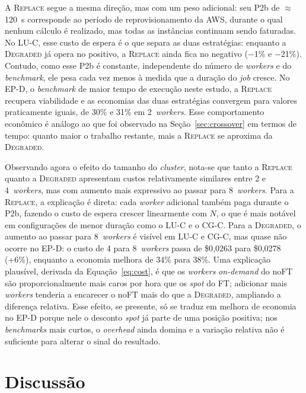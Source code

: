 A \textsc{Replace} segue a mesma direção, mas com um peso adicional: seu P2b de
$\approx$120~s corresponde ao período de reprovisionamento da AWS, durante o qual
nenhum cálculo é realizado, mas todas as instâncias continuam sendo faturadas. No
LU-C, esse custo de espera é o que separa as duas estratégias: enquanto a
\textsc{Degraded} já opera no positivo, a \textsc{Replace} ainda fica no negativo
($-$1\% e $-$21\%). Contudo, como esse P2b é constante, independente do número de
\textit{workers} e do \textit{benchmark}, ele pesa cada vez menos à medida que a
duração do \textit{job} cresce. No EP-D, o \textit{benchmark} de maior tempo de
execução neste estudo, a \textsc{Replace} recupera viabilidade e as economias das
duas estratégias convergem para valores praticamente iguais, de 30\% e 31\% em
2~\textit{workers}. Esse comportamento econômico é análogo ao que foi observado na
Seção~\ref{sec:crossover} em termos de tempo: quanto maior o trabalho restante, mais
a \textsc{Replace} se aproxima da \textsc{Degraded}.

Observando agora o efeito do tamanho do \textit{cluster}, nota-se que tanto a
\textsc{Replace} quanto a \textsc{Degraded} apresentam custos relativamente similares
entre 2 e 4~\textit{workers}, mas com aumento mais expressivo ao passar para
8~\textit{workers}. Para a \textsc{Replace}, a explicação é direta: cada
\textit{worker} adicional também paga durante o P2b, fazendo o custo de espera crescer
linearmente com $N$, o que é mais notável em configurações de menor duração como o
LU-C e o CG-C. Para a \textsc{Degraded}, o aumento ao passar para 8~\textit{workers}
é visível em LU-C e CG-C, mas quase não ocorre no EP-D: o custo de 4 para
8~\textit{workers} passa de \$0{,}0263 para \$0{,}0278 (+6\%), enquanto a economia
melhora de 34\% para 38\%. Uma explicação plausível, derivada da
Equação~\ref{eq:cost}, é que os \textit{workers} \textit{on-demand} do noFT são
proporcionalmente mais caros por hora que os \textit{spot} do FT; adicionar mais
\textit{workers} tenderia a encarecer o noFT mais do que a \textsc{Degraded},
ampliando a diferença relativa. Esse efeito, se presente, só se traduz em melhora
de economia no EP-D porque nele o desconto \textit{spot} já parte de uma posição
positiva; nos \textit{benchmarks} mais curtos, o \textit{overhead} ainda domina e a
variação relativa não é suficiente para alterar o sinal do resultado.


\section{Discussão}
\label{sec:discussao}

